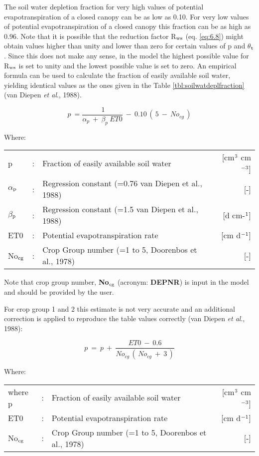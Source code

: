 The soil water depletion fraction for very high values of potential evapotranspiration of a
closed canopy can be as low as 0.10. For very low values of potential evapotranspiration
of a closed canopy this fraction can be as high as 0.96.
Note that it is possible that the reduction factor R$_{{\rm ws}}$ (eq. \ref{eq:6.8}) might obtain 
values higher
than unity and lower than zero for certain values of p and $\theta$$_{{\rm t}}$. Since this does not make
any sense, in the model the highest possible value for R$_{{\rm ws}}$ is set to unity and the lowest
possible value is set to zero.
An empirical formula can be used to calculate the fraction of easily available soil water,
yielding identical values as the ones given in the Table \ref{tbl:soilwatdeplfraction} 
(van Diepen {\it et al}., 1988).

\begin{equation}
\label{eq:6.10}
p~={\frac{~1}{ \alpha _{p} ~+~ \beta _{p} ~ET0}} ~-~ 0.10\, (\, 5~-~No _{cg} \, )
\end{equation}

Where:\\[5pt]
\begin{tabularx}{\textwidth}{llXr}
	p &:& Fraction of easily available soil water  & [cm$^{{\rm 3}}$ cm$^{{\rm -3}}$]\\
	$\alpha$$_{{\rm p}}$ &:& Regression constant {\small (=0.76 van Diepen et al., 1988)}  & [-]\\
	$\beta$$_{{\rm p}}$ &:& Regression constant {\small (=1.5 van Diepen et al., 1988)}  & [d cm-$^{{\rm 1}}$]\\
	ET0 &:& Potential evapotranspiration rate  & [cm d$^{{\rm -1}}$]\\
	No$_{{\rm cg}}$ &:& Crop Group number {\small (=1 to 5, Doorenbos et al., 1978)}  & [-]\\
\end{tabularx}

Note that crop group number, {\bf No$_{{\rm cg}}$} (acronym: {\bf DEPNR}) is input in the model and should
be provided by the user.

For crop group 1 and 2 this estimate is not very accurate and an additional correction is
applied to reproduce the table values correctly (van Diepen {\it et al}., 1988):

\begin{equation}
p~=~p~+~{\frac{ET0 ~-~ 0.6}{No _{cg} \, (\, No _{cg} ~+~3\, )}}
\end{equation}

Where:\\[5pt]
\begin{tabularx}{\textwidth}{llXr}
	where p &:& Fraction of easily available soil water  & [cm$^{{\rm 3}}$ cm$^{{\rm -3}}$]\\
	ET0 &:& Potential evapotranspiration rate  & [cm d$^{{\rm -1}}$]\\
	No$_{{\rm cg}}$ &:& Crop Group number {\small (=1 to 5, Doorenbos et al., 1978)}  & [-]\\
\end{tabularx}

